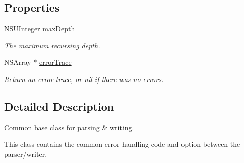 \subsection*{\-Properties}
\begin{DoxyCompactItemize}
\item 
\-N\-S\-U\-Integer \hyperlink{interface_s_b_json_base_abe3e47517711570a9a57e2d92a15055b}{max\-Depth}
\begin{DoxyCompactList}\small\item\em \-The maximum recursing depth. \end{DoxyCompactList}\item 
\-N\-S\-Array $\ast$ \hyperlink{interface_s_b_json_base_aa83f0ee5efade2fd26ddf6591ffd8dc0}{error\-Trace}
\begin{DoxyCompactList}\small\item\em \-Return an error trace, or nil if there was no errors. \end{DoxyCompactList}\end{DoxyCompactItemize}


\subsection{\-Detailed \-Description}
\-Common base class for parsing \& writing. 

\-This class contains the common error-\/handling code and option between the parser/writer. 

